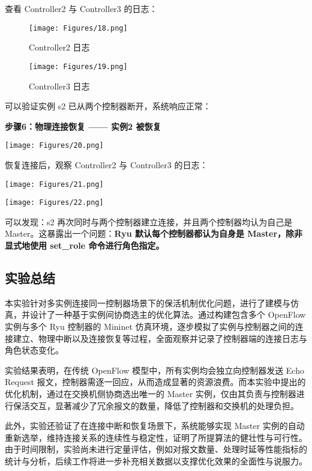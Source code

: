 \documentclass{article}
\begin{document}
\noindent 查看 Controller2 与 Controller3 的日志：
\begin{figure}[h]
\centering
\texttt{[image: Figures/18.png]}
\caption{Controller2 日志}
\end{figure}

\begin{figure}[h]
\centering
\texttt{[image: Figures/19.png]}
\caption{Controller3 日志}
\end{figure}

\noindent 可以验证实例 s2 已从两个控制器断开，系统响应正常：\\

\vspace{1em}

\noindent \textbf{步骤6：物理连接恢复 —— 实例2 被恢复}
\begin{center}
    \texttt{[image: Figures/20.png]}
    \captionsetup{type=figure}
\end{center}

\noindent 恢复连接后，观察 Controller2 与 Controller3 的日志：
\begin{center}
    \texttt{[image: Figures/21.png]}
    \captionsetup{type=figure}
\end{center}

\begin{center}
    \texttt{[image: Figures/22.png]}
    \captionsetup{type=figure}
\end{center}

 可以发现：s2 再次同时与两个控制器建立连接，并且两个控制器均认为自己是 Master。这暴露出一个问题：\textbf{Ryu 默认每个控制器都认为自身是 Master，除非显式地使用 set\_role 命令进行角色指定。}


\subsection{\textbf{实验总结}}

\quad\quad 本实验针对多实例连接同一控制器场景下的保活机制优化问题，进行了建模与仿真，并设计了一种基于实例间协商选主的优化算法。通过构建包含多个 OpenFlow 实例与多个 Ryu 控制器的 Mininet 仿真环境，逐步模拟了实例与控制器之间的连接建立、物理中断以及连接恢复等过程，全面观察并记录了控制器端的连接日志与角色状态变化。

实验结果表明，在传统 OpenFlow 模型中，所有实例均会独立向控制器发送 Echo Request 报文，控制器需逐一回应，从而造成显著的资源浪费。而本实验中提出的优化机制，通过在交换机侧协商选出唯一的 Master 实例，仅由其负责与控制器进行保活交互，显著减少了冗余报文的数量，降低了控制器和交换机的处理负担。

此外，实验还验证了在连接中断和恢复场景下，系统能够实现 Master 实例的自动重新选举，维持连接关系的连续性与稳定性，证明了所提算法的健壮性与可行性。由于时间限制，实验尚未进行定量评估，例如对报文数量、处理时延等性能指标的统计与分析，后续工作将进一步补充相关数据以支撑优化效果的全面性与说服力。


\printbibliography
\end{document}
